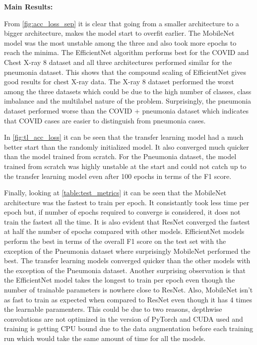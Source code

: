 \documentclass[10pt,twocolumn,letterpaper]{article}
\begin{document}
\textbf{Main Results:}

From \cref{fig:acc_loss_sep} it is clear that going from a smaller 
architecture to a bigger architecture, makes the model start to overfit earlier. 
The MobileNet model was the most unstable among the three and also took more epochs to reach 
the minima. The EfficientNet algorithm performs best for the COVID and Chest X-ray 8 
dataset and all three architectures performed similar for the pneumonia dataset. 
This shows that the compound scaling of EfficientNet gives good results for chest X-ray data.
The X-ray 8 dataset performed the worst among the three datasets which could be due to the 
high number of classes, class imbalance and the multilabel nature of the problem. 
Surprisingly, the pneumonia dataset performed worse than the COVID + pneumonia dataset 
which indicates that COVID cases are easier to distinguish from pneumonia cases. 

In \cref{fig:tl_acc_loss} it can be seen that the transfer learning model had a much better start than 
the randomly initialized model. It also converged much quicker than the model trained from scratch.
For the Pneumonia dataset, the model trained from scratch was highly unstable at the start 
and could not catch up to the transfer learning model even after 100 epochs in terms of the F1 score.

Finally, looking at \cref{table:test_metrics} it can be seen that the MobileNet architecture was 
the fastest to train per epoch. It consistantly took less time per epoch but, if number of 
epochs required to converge is considered, it does not train the fastest all the time.
It is also evident that ResNet converged the fastest at half the number of epochs compared with other models. 
EfficientNet models perform the best in terms of the overall F1 score on the test set with the exception of 
the Pneumonia dataset where surprisingly 
MobileNet performed the best. The transfer learning models converged quicker 
than the other models with the exception of the Pneumonia dataset. Another surprising observation 
is that the EfficientNet model takes the longest to train per epoch even though the number of trainable 
parameters is nowhere close to ResNet. Also, MobileNet isn't as fast to train as expected when 
compared to ResNet even though it has 4 times the learnable paramenters. This could be due to two 
reasons, depthwise convolutions are not optimized in the version of PyTorch and CUDA used and 
training is getting CPU bound due to the data augmentation before each training run which 
would take the same amount of time for all the models. 
\end{document}

